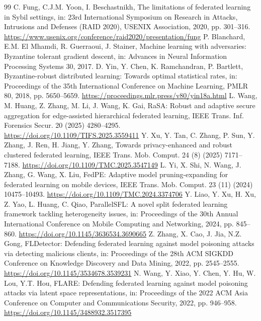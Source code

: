 \documentclass[final,5p,times,twocolumn]{elsarticle/elsarticle}
\begin{document}
\begin{thebibliography}{99}
     C. Fung, C.J.M. Yoon, I. Beschastnikh, The limitations of federated learning in Sybil settings, in: 23rd International Symposium on Research in Attacks, Intrusions and Defenses (RAID 2020), USENIX Association, 2020, pp. 301--316. \url{https://www.usenix.org/conference/raid2020/presentation/fung}
     P. Blanchard, E.M. El Mhamdi, R. Guerraoui, J. Stainer, Machine learning with adversaries: Byzantine tolerant gradient descent, in: Advances in Neural Information Processing Systems 30, 2017.
     D. Yin, Y. Chen, K. Ramchandran, P. Bartlett, Byzantine-robust distributed learning: Towards optimal statistical rates, in: Proceedings of the 35th International Conference on Machine Learning, PMLR 80, 2018, pp. 5650--5659. \url{https://proceedings.mlr.press/v80/yin18a.html}
     L. Wang, M. Huang, Z. Zhang, M. Li, J. Wang, K. Gai, RaSA: Robust and adaptive secure aggregation for edge-assisted hierarchical federated learning, IEEE Trans. Inf. Forensics Secur. 20 (2025) 4280--4295. \url{https://doi.org/10.1109/TIFS.2025.3559411}
     Y. Xu, Y. Tan, C. Zhang, P. Sun, Y. Zhang, J. Ren, H. Jiang, Y. Zhang, Towards privacy-enhanced and robust clustered federated learning, IEEE Trans. Mob. Comput. 24 (8) (2025) 7171--7188. \url{https://doi.org/10.1109/TMC.2025.3547149}
     L. Yi, X. Shi, N. Wang, J. Zhang, G. Wang, X. Liu, FedPE: Adaptive model pruning-expanding for federated learning on mobile devices, IEEE Trans. Mob. Comput. 23 (11) (2024) 10475--10493. \url{https://doi.org/10.1109/TMC.2024.3374706}
     Y. Liao, Y. Xu, H. Xu, Z. Yao, L. Huang, C. Qiao, ParallelSFL: A novel split federated learning framework tackling heterogeneity issues, in: Proceedings of the 30th Annual International Conference on Mobile Computing and Networking, 2024, pp. 845--860. \url{https://doi.org/10.1145/3636534.3690665}
     Z. Zhang, X. Cao, J. Jia, N.Z. Gong, FLDetector: Defending federated learning against model poisoning attacks via detecting malicious clients, in: Proceedings of the 28th ACM SIGKDD Conference on Knowledge Discovery and Data Mining, 2022, pp. 2545--2555. \url{https://doi.org/10.1145/3534678.3539231}
     N. Wang, Y. Xiao, Y. Chen, Y. Hu, W. Lou, Y.T. Hou, FLARE: Defending federated learning against model poisoning attacks via latent space representations, in: Proceedings of the 2022 ACM Asia Conference on Computer and Communications Security, 2022, pp. 946--958. \url{https://doi.org/10.1145/3488932.3517395}

\end{thebibliography}
\end{document}
